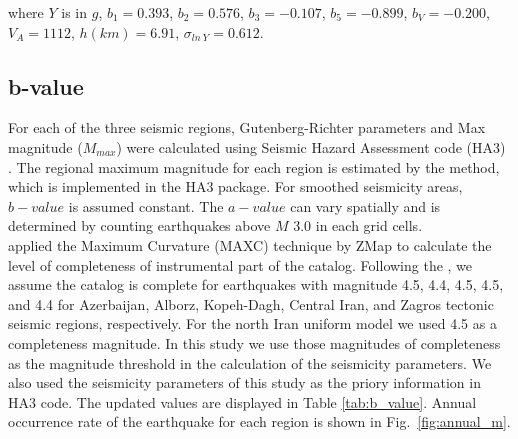 where $Y$ is in $g$, $b_1 = 0.393$, $b_2 = 0.576$, $b_3 = -0.107$, $b_5 = -0.899$, $b_V = -0.200$, $V_A = 1112$, $h(km) = 6.91$, $\sigma_{ln\ Y} = 0.612$.

\subsection{b-value}

For each of the three seismic regions, Gutenberg-Richter parameters and Max magnitude ($M_{max}$) were calculated using Seismic Hazard Assessment code (HA3) \citep{kijko2004}. The regional maximum magnitude for each region is estimated by the \citet{Kijko1989} method, which is implemented in the HA3 package. For smoothed seismicity areas, $b-value$ is assumed constant. The $a-value$ can vary spatially and is determined by counting earthquakes above $M$ 3.0 in each grid cells.\\
\noindent
\citet{Karimiparidari2013} applied the Maximum Curvature (MAXC) technique \citep{Wyss1999, Wiemer2000} by ZMap \citep{Wiemer2001} to calculate the level of completeness of instrumental part of the catalog.  Following the \citet{Karimiparidari2013}, we assume the catalog is complete for earthquakes with magnitude 4.5, 4.4, 4.5, 4.5, and 4.4 for Azerbaijan, Alborz,  Kopeh-Dagh, Central Iran, and Zagros tectonic seismic regions, respectively. For the north Iran uniform model we used 4.5 as a completeness magnitude. In this study we use those magnitudes of completeness as the magnitude threshold in the calculation of the seismicity parameters. We also used the seismicity parameters of this study \citep{Karimiparidari2013} as the priory information in HA3 code. The updated values are displayed in Table \ref{tab:b_value}.  Annual occurrence rate of the earthquake for each region is shown in Fig.~\ref{fig:annual_m}.

